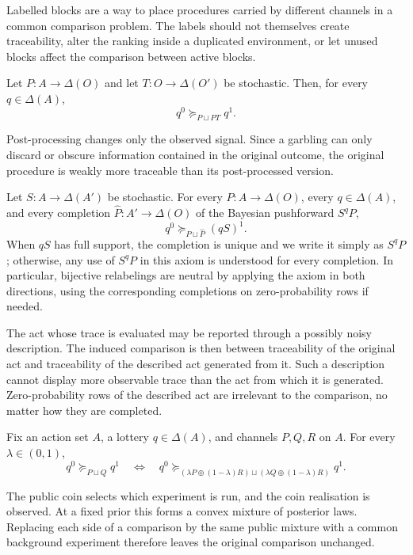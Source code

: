 \documentclass[11pt,a4paper]{article}
\theoremstyle{definition}
\newcommand{\1}{\mathbf 1}
\begin{document}
\begin{description}[leftmargin=*,style=sameline]
Labelled blocks are a way to place procedures carried by different channels in a common comparison problem.  The labels
should not themselves create traceability, alter the ranking inside a duplicated environment, or let unused blocks affect
the comparison between active blocks.

\item[(A4) Outcome post-processing aversion.]
Let $P:A\to\Delta(O)$ and let $T:O\to\Delta(O')$ be stochastic.  Then, for every $q\in\Delta(A)$,
\[
q^0\succeq_{P\sqcup PT}q^1.
\]

Post-processing changes only the observed signal.  Since a garbling can only discard or obscure information contained in
the original outcome, the original procedure is weakly more traceable than its post-processed version.

\item[(A5) Action-coarsening aversion.]
Let $S:A\to\Delta(A')$ be stochastic.  For every $P:A\to\Delta(O)$, every $q\in\Delta(A)$, and every completion
$\widehat P:A'\to\Delta(O)$ of the Bayesian pushforward $S^qP$,
\[
q^0\succeq_{P\sqcup \widehat P}(qS)^1.
\]
When $qS$ has full support, the completion is unique and we write it simply as $S^qP$; otherwise, any use of $S^qP$ in this
axiom is understood for every completion.  In particular, bijective relabelings are neutral by applying the axiom in both
directions, using the corresponding completions on zero-probability rows if needed.

The act whose trace is evaluated may be reported through a possibly noisy description.  The induced comparison is then
between traceability of the original act and traceability of the described act generated from it.  Such a description
cannot display more observable trace than the act from which it is generated.  Zero-probability rows of the described act
are irrelevant to the comparison, no matter how they are completed.

\item[(A6) Public-coin independence.]
Fix an action set $A$, a lottery $q\in\Delta(A)$, and channels $P,Q,R$ on $A$.  For every $\lambda\in(0,1)$,
\[
q^0\succeq_{P\sqcup Q}q^1
\quad\Longleftrightarrow\quad
q^0\succeq_{(\lambda P\oplus(1-\lambda)R)\sqcup(\lambda Q\oplus(1-\lambda)R)}q^1.
\]

The public coin selects which experiment is run, and the coin realisation is observed.  At a fixed prior this forms a
convex mixture of posterior laws.  Replacing each side of a comparison by the same public mixture with a common background
experiment therefore leaves the original comparison unchanged.


\end{description}
\end{document}
